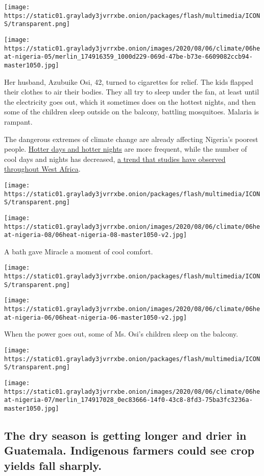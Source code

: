 \texttt{[image: https://static01.graylady3jvrrxbe.onion/packages/flash/multimedia/ICONS/transparent.png]}

\texttt{[image: https://static01.graylady3jvrrxbe.onion/images/2020/08/06/climate/06heat-nigeria-05/merlin\_174916359\_1000d229-069d-47be-b73e-6609082ccb94-master1050.jpg]}

Her husband, Azubuike Osi, 42, turned to cigarettes for relief. The kids
flapped their clothes to air their bodies. They all try to sleep under
the fan, at least until the electricity goes out, which it sometimes
does on the hottest nights, and then some of the children sleep outside
on the balcony, battling mosquitoes. Malaria is rampant.

The dangerous extremes of climate change are already affecting Nigeria's
poorest people.
\href{https://rmets.onlinelibrary.wiley.com/doi/10.1002/met.1791}{Hotter
days and hotter nights} are more frequent, while the number of cool days
and nights has decreased,
\href{https://www.ipcc.ch/site/assets/uploads/2018/02/WGIIAR5-Chap22_FINAL.pdf}{a
trend that studies have observed throughout West Africa}.

\texttt{[image: https://static01.graylady3jvrrxbe.onion/packages/flash/multimedia/ICONS/transparent.png]}

\texttt{[image: https://static01.graylady3jvrrxbe.onion/images/2020/08/06/climate/06heat-nigeria-08/06heat-nigeria-08-master1050-v2.jpg]}

A bath gave Miracle a moment of cool comfort.

\texttt{[image: https://static01.graylady3jvrrxbe.onion/packages/flash/multimedia/ICONS/transparent.png]}

\texttt{[image: https://static01.graylady3jvrrxbe.onion/images/2020/08/06/climate/06heat-nigeria-06/06heat-nigeria-06-master1050-v2.jpg]}

When the power goes out, some of Ms. Osi's children sleep on the
balcony.

\texttt{[image: https://static01.graylady3jvrrxbe.onion/packages/flash/multimedia/ICONS/transparent.png]}

\texttt{[image: https://static01.graylady3jvrrxbe.onion/images/2020/08/06/climate/06heat-nigeria-07/merlin\_174917028\_0ec83666-14f0-43c8-8fd3-75ba3fc3236a-master1050.jpg]}

\hypertarget{the-dry-season-is-getting-longer-and-drier-in-guatemala-indigenous-farmers-could-see-crop-yields-fall-sharply}{%
\subsection{The dry season is getting longer and drier in Guatemala.
Indigenous farmers could see crop yields fall
sharply.}\label{the-dry-season-is-getting-longer-and-drier-in-guatemala-indigenous-farmers-could-see-crop-yields-fall-sharply}}

